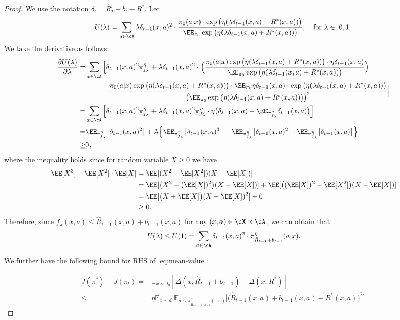 \documentclass[11pt]{article}
\newcommand{\rE}{\mathbb E}
\begin{document}
\begin{proof}
We use the notation $\delta_t=\hat R_t + b_t - R^*$.
Let 
\[
U(\lambda) = \sum_{a\in\cA}\lambda\delta_{t-1}(x,a)^2 \cdot \frac{\pi_0(a|x)\cdot\exp\big(\eta(\lambda\delta_{t-1}(x,a) + R^*(x,a))\big)}{\EE_{\pi_0}\exp\big(\eta(\lambda\delta_{t-1}(x,a) + R^*(x,a))\big)},\quad \text{for}~\lambda\in[0,1].
\]
We take the derivative as follows:
\begin{align*}
    \frac{\partial U(\lambda)}{\partial \lambda} =& \sum_{a\in\cA} \Big[\delta_{t-1}(x,a)^2 \pi_{f_\lambda}^\eta + \lambda\delta_{t-1}(x,a)^2\cdot\Big(\frac{\pi_0(a|x)\exp\big(\eta(\lambda\delta_{t-1}(x,a) + R^*(x,a))\big)\cdot\eta\delta_{t-1}(x,a)}{\EE_{\pi_0}\exp\big(\eta(\lambda\delta_{t-1}(x,a) + R^*(x,a))\big)}\Big)\\
    &\qquad - \frac{\pi_0(a|x)\exp\big(\eta(\lambda\delta_{t-1}(x,a) + R^*(x,a))\big)\cdot\EE_{\pi_0}\eta\delta_{t-1}(x,a) \cdot\exp\big(\eta(\lambda\delta_{t-1}(x,a) + R^*(x,a))\big)}{\big(\EE_{\pi_0}\exp\big(\eta(\lambda\delta_{t-1}(x,a) + R^*(x,a))\big)\big)^2}\Big]\\
    =& \sum_{a\in\cA}\Big[\delta_{t-1}(x,a)^2 \pi_{f_\lambda}^\eta + \lambda\delta_{t-1}(x,a)^2 \pi_{f_\lambda}^\eta\cdot\eta\big(\delta_{t-1}(x,a) - \EE_{\pi_{f_\lambda}^\eta}\delta_{t-1}(x,a)\big)\Big]\\
    =& \EE_{\pi_{f_\lambda}^\eta}\big[\delta_{t-1}(x,a)^2\big] + \lambda\Big\{\EE_{\pi_{f_\lambda}^\eta}\big[\delta_{t-1}(x,a)^3\big] - \EE_{\pi_{f_\lambda}^\eta}\big[\delta_{t-1}(x,a)^2\big]\cdot \EE_{\pi_{f_\lambda}^\eta}\big[\delta_{t-1}(x,a)\big] \Big\}\\
    \ge& 0,
\end{align*}
where the inequality holds since for random variable $X \ge 0$ we have
\begin{align*}
    \EE[X^3] - \EE[X^2] \cdot \EE[X] &= \EE[(X^2 - \EE[X^2])(X - \EE[X])]
    \\&= \EE[\big(X^2 - (\EE[X])^2\big)(X - \EE[X])] + \EE[\big((\EE[X])^2 -\EE[X^2]\big)(X - \EE[X])]
    \\&= \EE[\big(X + \EE[X]\big)(X - \EE[X])^2] + 0
    \\&\ge 0.
\end{align*}
Therefore, since $f_\lambda(x,a)\le \hat R_{t - 1}(x, a) + b_{t - 1}(x, a)$ for any $(x,a)\in\cX\times\cA$, we can obtain that
\begin{align*}
    U(\lambda) \le U(1) = \sum_{a\in\cA}\delta_{t-1}(x,a)^2\cdot \pi_{\hat R_{t - 1} + b_{t - 1}}^\eta(a|x).
\end{align*}

We further have the following bound for RHS of \eqref{eq:mean-value}:

    \begin{align*} 
    J(\pi^*) - J(\pi_t) =& 
    \rE_{x \sim d_0}[\Delta(x, \hat R_{t - 1} + b_{t - 1}) - \Delta(x, R^*)]\\
    \le& \eta \rE_{x \sim d_0} \rE_{a\sim \pi_{\hat R_{t - 1} + b_{t - 1}}^\eta(\cdot|x)} \bigl[\bigl(\hat R_{t - 1}(x, a) + b_{t - 1}(x, a) - R^*(x, a)\bigr)^2 \bigr]. 
    \end{align*}
\end{proof}
\end{document}
